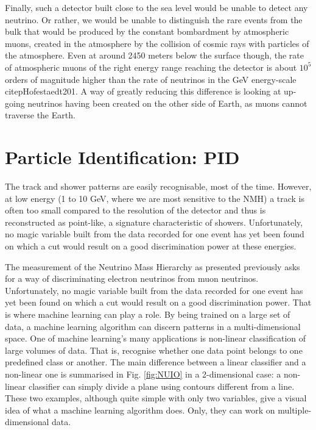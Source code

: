 Finally, such a detector built close to the sea level would be unable to detect any neutrino. Or rather, we would be unable to distinguish the rare events from the bulk that would be produced by the constant bombardment by atmospheric muons, created in the atmosphere by the collision of cosmic rays with particles of the atmosphere. Even at around 2450 meters below the surface though, the rate of atmospheric muons of the right energy range reaching the detector is about $10^5$ orders of magnitude higher than the rate of neutrinos in the GeV energy-scale citep{Hofestaedt201}. A way of greatly reducing this difference is looking at up-going neutrinos having been created on the other side of Earth, as muons cannot traverse the Earth.

\section{Particle Identification: PID}

The track and shower patterns are easily recognisable, most of the time. However, at low energy (1 to 10 GeV, where we are most sensitive to the NMH) a track is often too small compared to the resolution of the detector and thus is reconstructed as point-like, a signature characteristic of showers. Unfortunately, no magic variable built from the data recorded for one event has yet been found on which a cut would result on a good discrimination power at these energies.

The measurement of the Neutrino Mass Hierarchy as presented previously asks for a way of discriminating electron neutrinos from muon neutrinos. Unfortunately, no magic variable built from the data recorded for one event has yet been found on which a cut would result on a good discrimination power. That is where machine learning can play a role. By being trained on a large set of data, a machine learning algorithm can discern patterns in a multi-dimensional space. One of machine learning’s many applications is non-linear classification of large volumes of data. That is, recognise whether one data point belongs to one predefined class or another. The main difference between a linear classifier and a non-linear one is summarised in Fig. \ref{fig:NUIO} in a 2-dimensional case: a non-linear classifier can simply divide a plane using contours different from a line. These two examples, although quite simple with only two variables, give a visual idea of what a machine learning algorithm does. Only, they can work on multiple-dimensional data.

